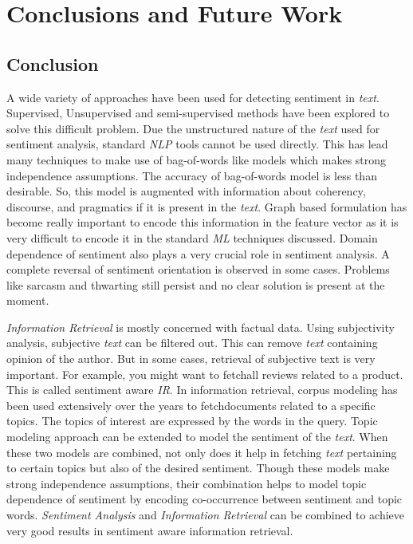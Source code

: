 
\chapter{Conclusions and Future Work} %

\label{conclusions} %



\section{Conclusion}

A wide variety of approaches have been used for detecting sentiment in \textit{text}. Supervised, Unsupervised and semi-supervised methods have been 
explored to solve this difficult problem. Due the unstructured nature of the \textit{text} used for sentiment analysis, standard \textit{NLP} tools 
cannot be used directly. This has lead many techniques to make use of bag-of-words like models which makes strong independence assumptions. The accuracy
of bag-of-words model is less than desirable. So, this model is augmented with information about coherency, discourse, and pragmatics if it is present 
in the \textit{text}. Graph based formulation has become really important to encode this information in the feature vector as it is very difficult to 
encode it in the standard \textit{ML} techniques discussed. Domain dependence of sentiment also plays a very crucial role in sentiment analysis. A complete
reversal of sentiment orientation is observed in some cases. Problems like sarcasm and thwarting still persist and no clear solution is present at the moment. 

\textit{Information Retrieval} is mostly concerned with factual data. Using subjectivity analysis, subjective \textit{text} can be filtered out. This can 
remove \textit{text} containing opinion of the author. But in some cases, retrieval of subjective text is very important. For example, you might want to 
fetchall reviews related to a product. This is called sentiment aware \textit{IR}. In information retrieval, corpus modeling has been used extensively over
the years to fetchdocuments related to a specific topics. The topics of interest are expressed by the words in the query. Topic modeling approach can be 
extended to model the sentiment of the \textit{text}. When these two models are combined, not only does it help in fetching \textit{text} pertaining to certain
topics but also of the desired sentiment. Though these models make strong independence assumptions, their combination helps to model topic dependence of 
sentiment by encoding co-occurrence between sentiment and topic words. \textit{Sentiment Analysis} and \textit{Information Retrieval} can be combined to 
achieve very good results in sentiment aware information retrieval.

